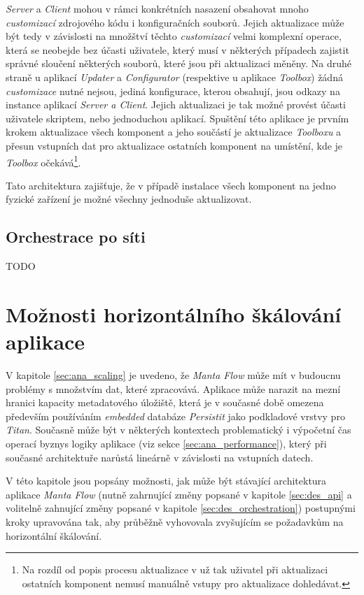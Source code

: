 \textit{Server} a \textit{Client} mohou v rámci konkrétních nasazení obsahovat mnoho \textit{customizací} zdrojového kódu i konfiguračních souborů. Jejich aktualizace může být tedy v závislosti na množštví těchto \textit{customizací} velmi komplexní operace, která se neobejde bez účasti uživatele, který musí v některých případech zajistit správné sloučení některých souborů, které jsou při aktualizaci měněny. Na druhé straně u aplikací \textit{Updater} a \textit{Configurator} (respektive u aplikace \textit{Toolbox}) žádná \textit{customizace} nutné nejsou, jediná konfigurace, kterou obsahují, jsou odkazy na instance aplikací \textit{Server a Client}. Jejich aktualizaci je tak možné provést účasti uživatele skriptem, nebo jednoduchou aplikací. Spuštění této aplikace je prvním krokem aktualizace všech komponent a jeho součástí je aktualizace \textit{Toolboxu} a přesun vstupních dat pro aktualizace ostatních komponent na umístění, kde je \textit{Toolbox} očekává\footnote{Na rozdíl od popis procesu aktualizace v \cite{Gondek16} už tak uživatel při aktualizaci ostatních komponent nemusí manuálně vstupy pro aktualizace dohledávat.}.

Tato architektura zajišťuje, že v případě instalace všech komponent na jedno fyzické zařízení je možné všechny jednoduše aktualizovat. 

\subsection{Orchestrace po síti}
\label{sec:des_orchestration_multinode}
TODO

\section{Možnosti horizontálního škálování aplikace}
\label{sec:des_scaling}
V kapitole \ref{sec:ana_scaling} je uvedeno, že \textit{Manta Flow} může mít v budoucnu problémy s množstvím dat, které zpracovává. Aplikace může narazit na mezní hranici kapacity metadatového úložiště, která je v současné době omezena především používáním \textit{embedded} databáze \textit{Persistit} jako podkladové vrstvy pro \textit{Titan}. Současně může být v některých kontextech problematický i výpočetní čas operací byznys logiky aplikace (viz sekce \ref{sec:ana_performance}), který při současné architektuře narůstá lineárně v závislosti na vstupních datech.

V této kapitole jsou popsány možnosti, jak může být stávající architektura aplikace \textit{Manta Flow} (nutně zahrnující změny popsané v kapitole \ref{sec:des_api} a volitelně zahnující změny popsané v kapitole \ref{sec:des_orchestration}) postupnými kroky upravována tak, aby průběžně vyhovovala zvyšujícím se požadavkům na horizontální škálování.


